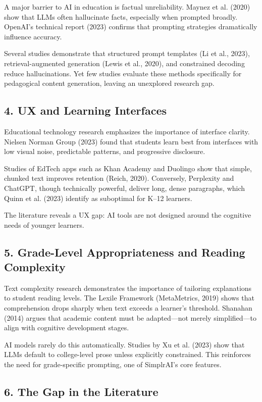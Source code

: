 \documentclass[11pt]{article}
\begin{document}
A major barrier to AI in education is factual unreliability. Maynez et al. (2020)
show that LLMs often hallucinate facts, especially when prompted broadly.
OpenAI's technical report (2023) confirms that prompting strategies dramatically
influence accuracy.

Several studies demonstrate that structured prompt templates (Li et al., 2023),
retrieval-augmented generation (Lewis et al., 2020), and constrained decoding
reduce hallucinations. Yet few studies evaluate these methods specifically for
pedagogical content generation, leaving an unexplored research gap.

\subsection*{4. UX and Learning Interfaces}

Educational technology research emphasizes the importance of interface clarity.
Nielsen Norman Group (2023) found that students learn best from interfaces with
low visual noise, predictable patterns, and progressive disclosure.

Studies of EdTech apps such as Khan Academy and Duolingo show that simple,
chunked text improves retention (Reich, 2020). Conversely, Perplexity and
ChatGPT, though technically powerful, deliver long, dense paragraphs, which
Quinn et al. (2023) identify as suboptimal for K--12 learners.

The literature reveals a UX gap: AI tools are not designed around the cognitive
needs of younger learners.

\subsection*{5. Grade-Level Appropriateness and Reading Complexity}

Text complexity research demonstrates the importance of tailoring explanations
to student reading levels. The Lexile Framework (MetaMetrics, 2019) shows that
comprehension drops sharply when text exceeds a learner's threshold. Shanahan
(2014) argues that academic content must be adapted---not merely
simplified---to align with cognitive development stages.

AI models rarely do this automatically. Studies by Xu et al. (2023) show that
LLMs default to college-level prose unless explicitly constrained. This
reinforces the need for grade-specific prompting, one of SimplrAI's core
features.

\subsection*{6. The Gap in the Literature}
\end{document}
